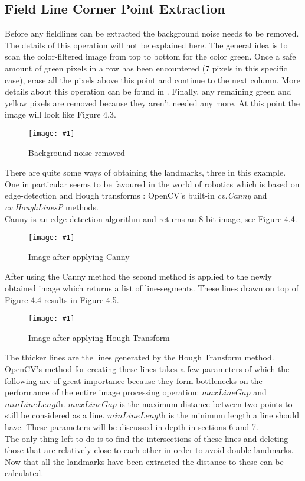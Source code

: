 \documentclass{ba-kecs}
\numberwithin{figure}{section}
\numberwithin{equation}{section}
\newcommand{\dkepic}[2]{ %
	\begin{figure}[H] %
	\texttt{[image: \#1]}
	\caption{#2}
	\label{#1}
	\end{figure}
}
\begin{document}
\subsection{Field Line Corner Point Extraction} 
Before any fieldlines can be extracted the background noise needs to be removed. The details of this operation will not be explained here. The general idea is to scan the color-filtered image from top to bottom for the color green. Once a safe amount of green pixels in a row has been encountered (7 pixels in this specific case), erase all the pixels above this point and continue to the next column. More details about this operation can be found in \cite{ref1}. Finally, any remaining green and yellow pixels are removed because they aren't needed any more. At this point the image will look like Figure 4.3.\\
\dkepic{figure_IP3}{Background noise removed}
There are quite some ways of obtaining the landmarks, three in this example. One in particular seems to be favoured in the world of robotics which is based on edge-detection and Hough transforms \cite{ref2}\cite{ref3}: OpenCV's built-in \emph{cv.Canny} and \emph{cv.HoughLinesP} methods. \\
Canny is an edge-detection algorithm and returns an 8-bit image, see Figure 4.4.\\
\dkepic{figure_IP4}{Image after applying Canny}
After using the Canny method the second method is applied to the newly obtained image which returns a list of line-segments. These lines drawn on top of Figure 4.4 results in Figure 4.5.\\
\dkepic{figure_IP5}{Image after applying Hough Transform}
The thicker lines are the lines generated by the Hough Transform method.
OpenCV's method for creating these lines takes a few parameters of which the following are of great importance because they form bottlenecks on the performance of the entire image processing operation: $\textit{maxLineGap}$ and $\textit{minLineLength}$. $\textit{maxLineGap}$ is the maximum distance between two points to still be considered as a line. $\textit{minLineLength}$ is the minimum length a line should have. These parameters will be discussed in-depth in sections 6 and 7. \\
The only thing left to do is to find the intersections of these lines and deleting those that are relatively close to each other in order to avoid double landmarks. \\
Now that all the landmarks have been extracted the distance to these can be calculated. 
\end{document}
